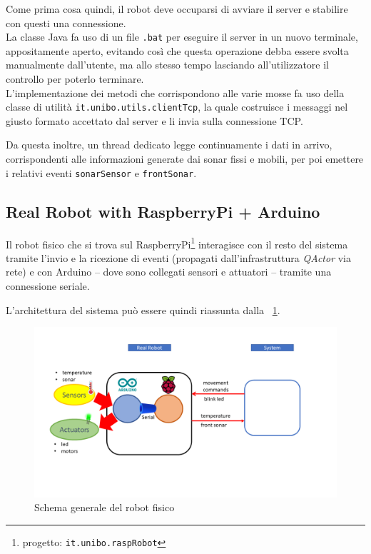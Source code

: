 \documentclass{../llncs}
\newcommand{\codescript}[1]{{\mbox{\small{\texttt{#1}}}}\xspace}
\newcommand{\qa}{\textsf{\textit{QActor}}\xspace}
\newcommand{\labelssec}[1]{\label{ssec:#1}}
\newcommand{\labelfig}[1]{\label{fig:#1}}
\newcommand{\xf}[1]{\figurename~\ref{fig:#1}}
\begin{document}
Come prima cosa quindi, il robot deve occuparsi di avviare il server e stabilire con questi una connessione.\\



La classe Java fa uso di un file \texttt{.bat} per eseguire il server in un nuovo terminale, appositamente aperto, evitando così che questa operazione debba essere svolta manualmente dall'utente, ma allo stesso tempo lasciando all'utilizzatore il controllo per poterlo terminare.\\



L'implementazione dei metodi che corrispondono alle varie mosse fa uso della classe di utilità \codescript{it.unibo.utils.clientTcp}, la quale costruisce i messaggi nel giusto formato accettato dal server e li invia sulla connessione TCP.

Da questa inoltre, un thread dedicato legge continuamente i dati in arrivo, corrispondenti alle informazioni generate dai sonar fissi e mobili, per poi emettere i relativi eventi \codescript{sonarSensor} e \codescript{frontSonar}.

\subsection{Real Robot with RaspberryPi + Arduino}
\labelssec{realRobotRaspImpl}
Il robot fisico che si trova sul RaspberryPi\footnote{progetto: \texttt{it.unibo.raspRobot}} interagisce con il resto del sistema tramite l'invio e la ricezione di eventi (propagati dall'infrastruttura \qa via rete) e con Arduino -- dove sono collegati sensori e attuatori -- tramite una connessione seriale.

L'architettura del sistema può essere quindi riassunta dalla \xf{raspRobotSchema}.

\begin{figure}[!htb]
\centering
\includegraphics[scale=0.40]{img/arduinoRaspberry.png}
\caption{Schema generale del robot fisico}\labelfig{raspRobotSchema}
\end{figure}
\end{document}
